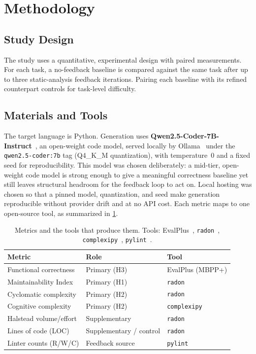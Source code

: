 
\section{Methodology}
\label{sec:method}

\subsection{Study Design}
The study uses a quantitative, experimental design with paired measurements. For
each task, a no-feedback baseline is compared against the same task after up to
three static-analysis feedback iterations. Pairing each baseline with its
refined counterpart controls for task-level difficulty.

\subsection{Materials and Tools}
The target language is Python. Generation uses
\textbf{Qwen2.5-Coder-7B-Instruct}~\citep{qwen25coder}, an open-weight code model,
served locally by Ollama~\citep{ollama} under the \texttt{qwen2.5-coder:7b} tag
(Q4\_K\_M quantization), with temperature~0 and a fixed seed for reproducibility. This model was chosen
deliberately: a mid-tier, open-weight code model is strong enough to give a
meaningful correctness baseline yet still leaves structural headroom for the
feedback loop to act on. Local hosting was chosen so
that a pinned model, quantization, and seed make generation reproducible without
provider drift and at no API cost. Each metric maps to one open-source tool, as
summarized in \cref{tab:tooling}.

\begin{table}[t]
  \centering
  \caption{Metrics and the tools that produce them. Tools:
    EvalPlus~\citep{evalplus_tool}, \texttt{radon}~\citep{radon_docs},
    \texttt{complexipy}~\citep{complexipy_tool}, \texttt{pylint}~\citep{pylint_tool}.}
  \label{tab:tooling}
  \begin{tabular}{lll}
    \toprule
    \textbf{Metric} & \textbf{Role} & \textbf{Tool} \\
    \midrule
    Functional correctness            & Primary (H3) & EvalPlus (MBPP+) \\
    Maintainability Index             & Primary (H1) & \texttt{radon} \\
    Cyclomatic complexity             & Primary (H2) & \texttt{radon} \\
    Cognitive complexity              & Primary (H2) & \texttt{complexipy} \\
    Halstead volume/effort            & Supplementary & \texttt{radon} \\
    Lines of code (LOC)               & Supplementary / control & \texttt{radon} \\
    Linter counts (R/W/C)             & Feedback source & \texttt{pylint} \\
    \bottomrule
  \end{tabular}
\end{table}

